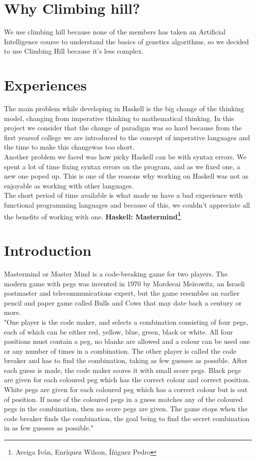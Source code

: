 \section{Why Climbing hill?}
We use climbing hill because none of the members has taken an Artificial Intelligence course to understand the basics of genetics algorithms, so we decided to use Climbing Hill because it's less complex.

\section{Experiences}
The main problem while developing in Haskell is the big change of the thinking model, changing from imperative thinking to mathematical thinking. In this project we consider that the change of paradigm was so hard  because from the first yearsof college we are introduced to the concept of imperative languages and the time to make this changewas too short.\\

Another problem we faced was how picky Haskell can be with syntax errors. We spent a lot of time fixing syntax errors on the program, and as we fixed one, a new one poped up. This is one of the reasons why working on Haskell was not as enjoyable as working with other languages.\\

The short period of time available is what made us have a bad experience with functional programming languages and because of this, we couldn't appreciate all the benefits of working with one.
\textbf{Haskell: Mastermind\footnote{Aveiga Iván, Enríquez Wilson, Íñiguez Pedro}}

\section{Introduction}
Mastermind or Master Mind is a code-breaking game for two players. The modern game with pegs was invented in 1970 by Mordecai Meirowitz, an Israeli postmaster and telecommunications expert, but the game resembles an earlier pencil and paper game called Bulls and Cows that may date back a century or more. \\

"One player is the code maker, and selects a combination consisting of four pegs, each of which can be either red, yellow, blue, green, black or white. All four positions must contain a peg, no blanks are allowed and a colour can be used one or any number of times in a combination. The other player is called the code breaker and has to find
the combination, taking as few guesses as possible. After each guess is made, the code maker scores it
with small score pegs. Black pegs are given for each coloured peg which has the correct colour and correct
position. White pegs are given for each coloured peg which has a correct colour but is out of position. If
none of the coloured pegs in a guess matches any of the coloured pegs in the combination, then no score
pegs are given. The game stops when the code breaker finds the combination, the goal being to find
the secret combination in as few guesses as possible."

